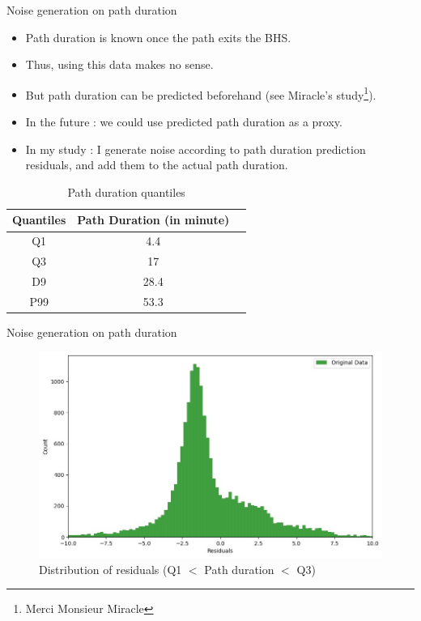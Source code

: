 \documentclass{beamer}
\begin{document}
\begin{frame}{Noise generation on path duration}

\begin{itemize}
    \item Path duration is known once the path exits the BHS.
    \item Thus, using this data makes no sense.
    \item But path duration can be predicted beforehand (see Miracle's study\footnote{Merci Monsieur Miracle}).
    \item In the future : we could use predicted path duration as a proxy. 
    \item In my study : I generate noise according to path duration prediction residuals, and add them to the actual path duration.
\end{itemize}


\begin{table}[h]
  \centering
  \caption{Path duration quantiles}
  \label{tab:Path duration quantiles}
  \begin{tabular}{|c|c|c|}
        \toprule
        \textbf{Quantiles} & \textbf{Path Duration (in minute)}  \\
        \midrule
        Q1 & 4.4  \\
        Q3 & 17  \\
        D9 & 28.4  \\
        P99 & 53.3  \\
        \bottomrule
  \end{tabular}
\end{table}
\end{frame}


\begin{frame}{Noise generation on path duration} 

\begin{figure}[ht]
  \centering
    \includegraphics[width=\linewidth]{Q1_Q3 distribution.jpg}
    \caption{Distribution of residuals (Q1 $<$ Path duration $<$ Q3)}
    \label{fig:Distribution of residuals for path duration between Q1 and Q3}
\end{figure}
\end{frame}
\end{document}
